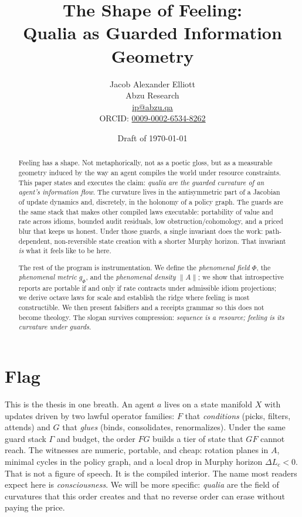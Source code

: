 \documentclass[11pt]{article}
\title{\Large\bfseries The Shape of Feeling:\\
Qualia as Guarded Information Geometry}
\author{Jacob Alexander Elliott\\
\small Abzu Research\\
\small \href{mailto:ip@abzu.qa}{ip@abzu.qa}\\
\small ORCID: \href{https://orcid.org/0009-0002-6534-8262}{0009-0002-6534-8262}}
\date{Draft of \today}
\newcommand{\1}{\mathbf{1}}
\newcommand{\Lc}{L_c}
\newcommand{\Aanti}{A}  %
\newcommand{\Guard}{\Gamma}
\begin{document}
\maketitle

\begin{abstract}
Feeling has a shape. Not metaphorically, not as a poetic gloss, but as a measurable geometry induced by the way an agent compiles the world under resource constraints. This paper states and executes the claim: \emph{qualia are the guarded curvature of an agent's information flow}. The curvature lives in the antisymmetric part of a Jacobian of update dynamics and, discretely, in the holonomy of a policy graph. The guards are the same stack that makes other compiled laws executable: portability of value and rate across idioms, bounded audit residuals, low obstruction/cohomology, and a priced blur that keeps us honest. Under those guards, a single invariant does the work: path-dependent, non-reversible state creation with a shorter Murphy horizon. That invariant \emph{is} what it feels like to be here.

The rest of the program is instrumentation. We define the \emph{phenomenal field} $\Phi$, the \emph{phenomenal metric} $g_\Phi$, and the \emph{phenomenal density} $\|\Aanti\|$; we show that introspective reports are portable if and only if rate contracts under admissible idiom projections; we derive octave laws for scale and establish the ridge where feeling is most constructible. We then present falsifiers and a receipts grammar so this does not become theology. The slogan survives compression: \emph{sequence is a resource; feeling is its curvature under guards.}
\end{abstract}

\tableofcontents

\section{Flag}
This is the thesis in one breath. An agent $a$ lives on a state manifold $X$ with updates driven by two lawful operator families: $F$ that \emph{conditions} (picks, filters, attends) and $G$ that \emph{glues} (binds, consolidates, renormalizes). Under the same guard stack $\Guard$ and budget, the order $FG$ builds a tier of state that $GF$ cannot reach. The witnesses are numeric, portable, and cheap: rotation planes in $\Aanti$, minimal cycles in the policy graph, and a local drop in Murphy horizon $\Delta\Lc<0$. That is not a figure of speech. It is the compiled interior. The name most readers expect here is \emph{consciousness}. We will be more specific: \emph{qualia} are the field of curvatures that this order creates and that no reverse order can erase without paying the price.
\end{document}
